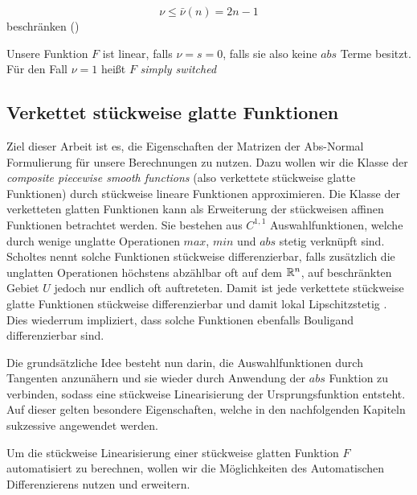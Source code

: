 \[
\nu \leq \bar \nu(n) = 2n-1                                                                                                                                                                                                                                                                                                                                                                                                                                                                                                                                                                                                                                                            \]
beschränken (\cite[S.3]{plan})


Unsere Funktion $F$ ist linear, falls $\nu=s = 0$, falls sie also keine $abs$ Terme besitzt. Für den Fall $\nu=1$ heißt $F$ \textit{simply switched}
\subsection{Verkettet stückweise glatte Funktionen}
Ziel dieser Arbeit ist es, die Eigenschaften der Matrizen der Abs-Normal Formulierung für unsere Berechnungen zu nutzen.
Dazu wollen wir die Klasse der \textit{composite piecewise smooth functions} (also verkettete stückweise glatte Funktionen) durch stückweise lineare Funktionen approximieren.
Die Klasse der verketteten glatten Funktionen kann als Erweiterung der stückweisen affinen Funktionen betrachtet werden. Sie bestehen aus $C^{1,1}$ Auswahlfunktionen, welche durch wenige unglatte Operationen $max$, $min$ und $abs$ stetig verknüpft sind.
Scholtes nennt solche Funktionen stückweise differenzierbar, falls  zusätzlich die unglatten Operationen höchstens abzählbar oft auf dem $\mathbb{R}^n$, auf beschränkten Gebiet $U$ jedoch nur endlich oft auftreteten. Damit ist jede verkettete stückweise glatte Funktionen stückweise differenzierbar und damit lokal Lipschitzstetig \cite[Cor. 4.1.1.]{scholtes2012introduction}. Dies wiederrum impliziert, dass solche Funktionen ebenfalls Bouligand differenzierbar sind.

Die grundsätzliche Idee besteht nun darin, die Auswahlfunktionen durch Tangenten anzunähern und sie wieder durch Anwendung der $abs$ Funktion zu verbinden, sodass eine stückweise Linearisierung der Ursprungsfunktion entsteht. Auf dieser gelten besondere Eigenschaften, welche in den nachfolgenden Kapiteln sukzessive angewendet werden.

Um die stückweise Linearisierung einer stückweise glatten Funktion $F$ automatisiert zu berechnen, wollen wir die Möglichkeiten des Automatischen Differenzierens nutzen und erweitern.

